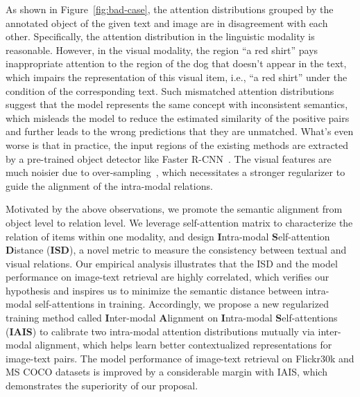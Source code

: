 \documentclass[11pt,a4paper]{article}
\begin{document}
As shown in Figure~\ref{fig:bad-case}, the attention distributions grouped by the annotated object of the given text and image are in disagreement with each other. 
Specifically, the attention distribution in the linguistic modality is reasonable. However, in the visual modality, the region ``a red shirt'' pays inappropriate attention to the region of the dog that doesn't appear in the text, which impairs the representation of this visual item, i.e., ``a red shirt'' under the condition of the corresponding text.
Such mismatched attention distributions suggest that the model represents the same concept with inconsistent semantics, which misleads the model to reduce the estimated similarity of the positive pairs and further leads to the wrong predictions that they are unmatched.
What's even worse is that in practice, the input regions of the existing methods are extracted by a pre-trained object detector like Faster R-CNN~\cite{faster-rcnn}. 
The visual features are much noisier due to over-sampling~\cite{Oscar, BUTD}, which necessitates a stronger regularizer to guide the alignment of the intra-modal relations.

Motivated by the above observations, we promote the semantic alignment from object level to relation level. 
We leverage self-attention matrix to characterize the relation of items within one modality, and design \textbf{I}ntra-modal \textbf{S}elf-attention \textbf{D}istance (\textbf{ISD}), a novel metric to measure the consistency between textual and visual relations. 
Our empirical analysis illustrates that the ISD and the model performance on image-text retrieval are highly correlated, which verifies our hypothesis and inspires us to minimize the semantic distance between intra-modal self-attentions in training. 
Accordingly, we propose a new regularized training method called \textbf{I}nter-modal \textbf{A}lignment on \textbf{I}ntra-modal \textbf{S}elf-attentions (\textbf{IAIS}) to calibrate two intra-modal attention distributions mutually via inter-modal alignment, which helps learn better contextualized representations for image-text pairs. 
The model performance of image-text retrieval on Flickr30k and MS COCO datasets is improved by a considerable margin with IAIS, which demonstrates the superiority of our proposal.
\end{document}
